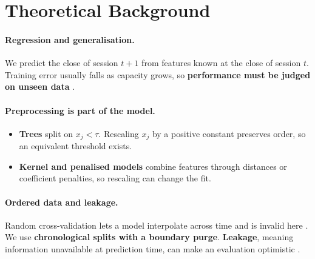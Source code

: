\section{Theoretical Background}
\label{sec:background}

\paragraph{Regression and generalisation.}
We predict the close of session $t+1$ from features known at the close of session
$t$. Training error usually falls as capacity grows, so \textbf{performance must
be judged on unseen data} \citep{hastie2009elements}.

\paragraph{Preprocessing is part of the model.}
\begin{itemize}
  \item \textbf{Trees} split on $x_j < \tau$. Rescaling $x_j$ by a positive
  constant preserves order, so an equivalent threshold exists.
  \item \textbf{Kernel and penalised models} combine features through distances or
  coefficient penalties, so rescaling can change the fit.
\end{itemize}

\paragraph{Ordered data and leakage.}
Random cross-validation lets a model interpolate across time and is invalid here
\citep{bergmeir2018note,roberts2017crossvalidation}. We use \textbf{chronological
splits with a boundary purge}. \textbf{Leakage}, meaning information unavailable
at prediction time, can make an evaluation optimistic \citep{kaufman2012leakage}.
